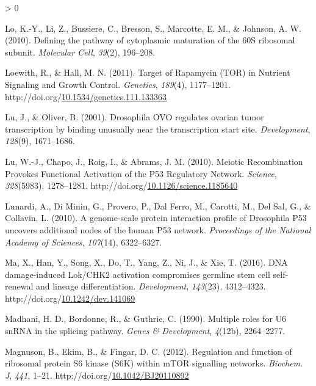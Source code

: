 \documentclass[12pt,oneside]{reedthesis}
\newlength{\cslhangindent}
\newenvironment{CSLReferences}[2] %
 {%
  \setlength{\parindent}{0pt}
  \ifodd #1 \everypar{\setlength{\hangindent}{\cslhangindent}}\ignorespaces\fi
  \ifnum #2 > 0
  \setlength{\parskip}{#2\baselineskip}
  \fi
 }%
 {}
\begin{document}
\begin{CSLReferences}{1}{0}
\leavevmode\hypertarget{ref-Lo2010a}{}%
Lo, K.-Y., Li, Z., Bussiere, C., Bresson, S., Marcotte, E. M., \& Johnson, A. W. (2010). Defining the pathway of cytoplasmic maturation of the {60S} ribosomal subunit. \emph{Molecular Cell}, \emph{39}(2), 196--208.

\leavevmode\hypertarget{ref-loewithTargetRapamycinTOR2011}{}%
Loewith, R., \& Hall, M. N. (2011). Target of {Rapamycin} ({TOR}) in {Nutrient Signaling} and {Growth Control}. \emph{Genetics}, \emph{189}(4), 1177--1201. http://doi.org/\href{https://doi.org/10.1534/genetics.111.133363}{10.1534/genetics.111.133363}

\leavevmode\hypertarget{ref-Lu2001}{}%
Lu, J., \& Oliver, B. (2001). Drosophila {OVO} regulates ovarian tumor transcription by binding unusually near the transcription start site. \emph{Development}, \emph{128}(9), 1671--1686.

\leavevmode\hypertarget{ref-luMeioticRecombinationProvokes2010}{}%
Lu, W.-J., Chapo, J., Roig, I., \& Abrams, J. M. (2010). Meiotic {Recombination Provokes Functional Activation} of the P53 {Regulatory Network}. \emph{Science}, \emph{328}(5983), 1278--1281. http://doi.org/\href{https://doi.org/10.1126/science.1185640}{10.1126/science.1185640}

\leavevmode\hypertarget{ref-Lunardi2010a}{}%
Lunardi, A., Di Minin, G., Provero, P., Dal Ferro, M., Carotti, M., Del Sal, G., \& Collavin, L. (2010). A genome-scale protein interaction profile of {Drosophila} P53 uncovers additional nodes of the human P53 network. \emph{Proceedings of the National Academy of Sciences}, \emph{107}(14), 6322--6327.

\leavevmode\hypertarget{ref-maDNADamageinducedLok2016}{}%
Ma, X., Han, Y., Song, X., Do, T., Yang, Z., Ni, J., \& Xie, T. (2016). {DNA} damage-induced {Lok}/{CHK2} activation compromises germline stem cell self-renewal and lineage differentiation. \emph{Development}, \emph{143}(23), 4312--4323. http://doi.org/\href{https://doi.org/10.1242/dev.141069}{10.1242/dev.141069}

\leavevmode\hypertarget{ref-Madhani1990}{}%
Madhani, H. D., Bordonne, R., \& Guthrie, C. (1990). Multiple roles for {U6 snRNA} in the splicing pathway. \emph{Genes \& Development}, \emph{4}(12b), 2264--2277.

\leavevmode\hypertarget{ref-Magnuson2012c}{}%
Magnuson, B., Ekim, B., \& Fingar, D. C. (2012). Regulation and function of ribosomal protein {S6} kinase ({S6K}) within {mTOR} signalling networks. \emph{Biochem. J}, \emph{441}, 1--21. http://doi.org/\href{https://doi.org/10.1042/BJ20110892}{10.1042/BJ20110892}


\end{CSLReferences}
\end{document}
